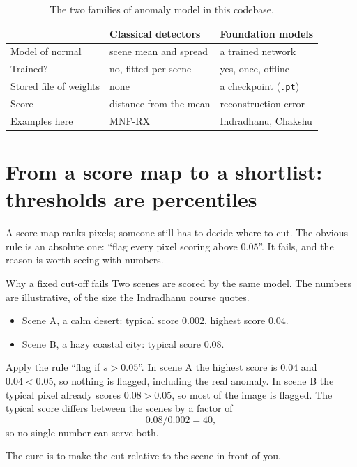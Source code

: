 \begin{table}[htbp]\centering
\caption{The two families of anomaly model in this codebase.}\label{tab:problem:families}
\begin{tabular}{@{}lll@{}}\toprule
 & Classical detectors & Foundation models\\\midrule
Model of normal & scene mean and spread & a trained network \\
Trained? & no, fitted per scene & yes, once, offline \\
Stored file of weights & none & a checkpoint (\texttt{.pt}) \\
Score & distance from the mean & reconstruction error \\
Examples here & MNF-RX & Indradhanu, Chakshu \\\bottomrule
\end{tabular}
\end{table}

\section{From a score map to a shortlist: thresholds are percentiles}\label{sec:problem:threshold}

A score map ranks pixels; someone still has to decide where to cut. The obvious rule is an
absolute one: ``flag every pixel scoring above $0.05$''. It fails, and the reason is worth seeing
with numbers.

\begin{worked}[label={we:problem:fixedcut}]{Why a fixed cut-off fails}
Two scenes are scored by the same model. The numbers are illustrative\tagA, of the size the
Indradhanu course quotes.
\begin{itemize}
\item Scene A, a calm desert: typical score $0.002$, highest score $0.04$.
\item Scene B, a hazy coastal city: typical score $0.08$.
\end{itemize}
Apply the rule ``flag if $s > 0.05$''. In scene A the highest score is $0.04$ and $0.04 < 0.05$,
so nothing is flagged, including the real anomaly. In scene B the typical pixel already scores
$0.08 > 0.05$, so most of the image is flagged. The typical score differs between the scenes by a
factor of
\[ 0.08 / 0.002 = 40, \]
so no single number can serve both.
\end{worked}

The cure is to make the cut relative to the scene in front of you.

